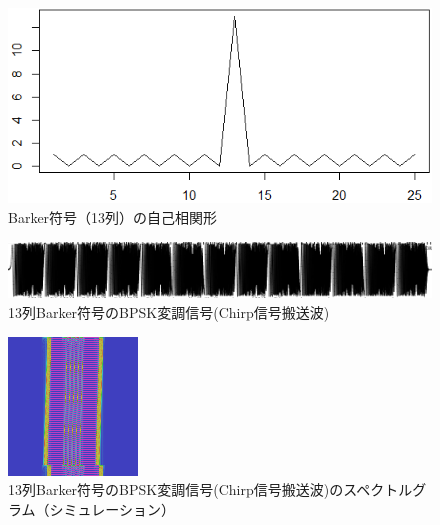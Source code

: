 \begin{figure}[pb]\centering
\includegraphics[clip,width=0.9\hsize]{img/barkercode.png}
\caption{Barker符号（13列）の自己相関形}\label{fig:barkercode}
\end{figure}

\begin{figure}[pb]\centering
\includegraphics[clip,width=1.0\hsize]{img/barker_chirp.png}
\caption{13列Barker符号のBPSK変調信号(Chirp信号搬送波)}\label{fig:barker_chirp}
\end{figure}

\begin{figure}[pb]\centering
\includegraphics[clip,width=0.75\hsize]{img/barker_coded_chirp.png}
\caption{13列Barker符号のBPSK変調信号(Chirp信号搬送波)のスペクトルグラム（シミュレーション）}\label{fig:barker_coded_chirp}
\end{figure}


